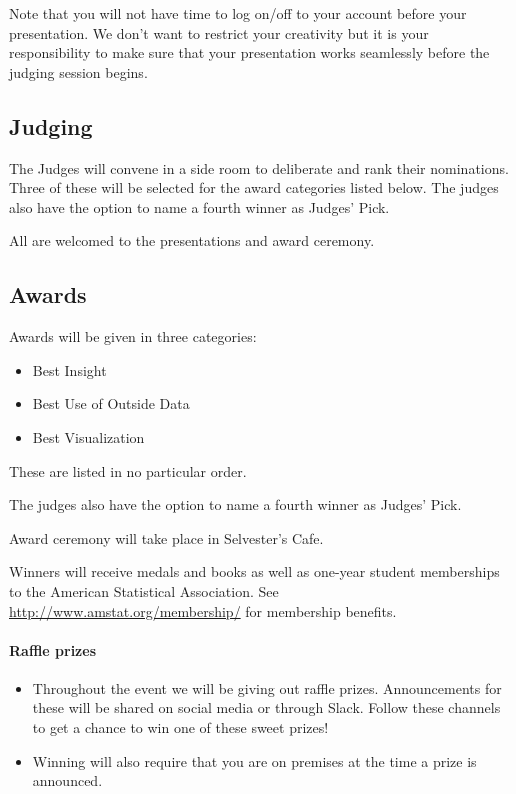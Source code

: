 \documentclass[]{article}
\providecommand{\tightlist}{%
  \setlength{\itemsep}{0pt}\setlength{\parskip}{0pt}}
\let\oldparagraph\paragraph
\renewcommand{\paragraph}[1]{\oldparagraph{#1}\mbox{}}
\begin{document}
Note that you will not have time to log on/off to your account before
your presentation. We don't want to restrict your creativity but it is
your responsibility to make sure that your presentation works seamlessly
before the judging session begins.

\hypertarget{judging}{%
\subsection{Judging}\label{judging}}

The Judges will convene in a side room to deliberate and rank their
nominations. Three of these will be selected for the award categories
listed below. The judges also have the option to name a fourth winner as
Judges' Pick.

All are welcomed to the presentations and award ceremony.

\hypertarget{awards}{%
\subsection{Awards}\label{awards}}

Awards will be given in three categories:

\begin{itemize}
\tightlist
\item
  Best Insight
\item
  Best Use of Outside Data
\item
  Best Visualization
\end{itemize}

These are listed in no particular order.

The judges also have the option to name a fourth winner as Judges' Pick.

Award ceremony will take place in Selvester's Cafe.

Winners will receive medals and books as well as one-year student
memberships to the American Statistical Association. See
\url{http://www.amstat.org/membership/} for membership benefits.

\hypertarget{raffle-prizes}{%
\paragraph{Raffle prizes}\label{raffle-prizes}}

\begin{itemize}
\tightlist
\item
  Throughout the event we will be giving out raffle prizes.
  Announcements for these will be shared on social media or through
  Slack. Follow these channels to get a chance to win one of these sweet
  prizes!
\item
  Winning will also require that you are on premises at the time a prize
  is announced.
\end{itemize}
\end{document}
